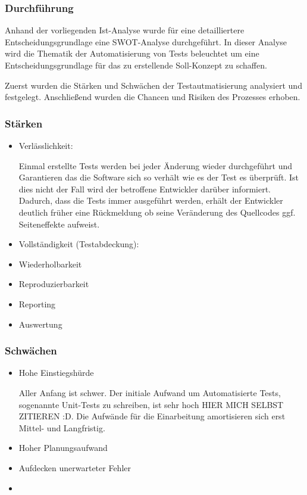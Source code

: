\subsubsection{Durchführung}
Anhand der vorliegenden Ist-Analyse wurde für eine detailliertere Entscheidungsgrundlage eine SWOT-Analyse durchgeführt. In dieser Analyse wird die Thematik der Automatisierung von Tests beleuchtet um eine Entscheidungsgrundlage für das zu erstellende Soll-Konzept zu schaffen.

Zuerst wurden die Stärken und Schwächen der Testautmatisierung analysiert und festgelegt. Anschließend wurden die Chancen und Risiken des Prozesses erhoben. 
\subsubsection{Stärken}
\begin{itemize}	
	\item Verlässlichkeit:
	
	Einmal erstellte Tests werden bei jeder Änderung wieder durchgeführt und Garantieren das die Software sich so verhält wie es der Test es überprüft. Ist dies nicht der Fall wird der betroffene Entwickler darüber informiert. Dadurch, dass die Tests immer ausgeführt werden, erhält der Entwickler deutlich früher eine Rückmeldung ob seine Veränderung des Quellcodes ggf. Seiteneffekte aufweist.
	
	\item Vollständigkeit (Testabdeckung):
	
	\item Wiederholbarkeit
	
	\item Reproduzierbarkeit
	
	\item Reporting
	
	\item Auswertung

\end{itemize}

\subsubsection{Schwächen}
\begin{itemize}	
	\item Hohe Einstiegshürde
	
	Aller Anfang ist schwer. Der initiale Aufwand um Automatisierte Tests, sogenannte Unit-Tests zu schreiben, ist sehr hoch HIER MICH SELBST ZITIEREN :D. Die Aufwände für die Einarbeitung amortisieren sich erst Mittel- und Langfristig.
	
	\item Hoher Planungsaufwand
	
	\item Aufdecken unerwarteter Fehler
	
	\item 
	
\end{itemize}
